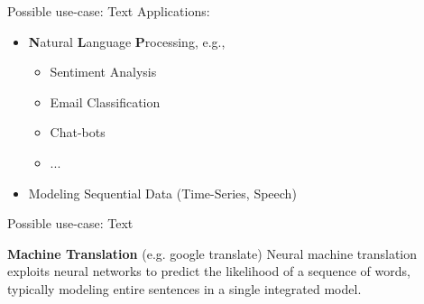 \begin{frame} {Possible use-case: Text}
Applications:
\vspace{.7cm}
\begin{itemize}
\item \textbf{N}atural \textbf{L}anguage \textbf{P}rocessing, e.g.,
\begin{itemize}
\item Sentiment Analysis
\vspace{.3cm}
\item Email Classification
\vspace{.3cm}
\item Chat-bots
\vspace{.3cm}
\item $...$
\end{itemize}
\vspace{.7cm}
\item Modeling Sequential Data (Time-Series, Speech)
\end{itemize}
\end{frame}

\begin{frame} {Possible use-case: Text}
\begin{figure}
\centering
{}
\end{figure}
\textbf{Machine Translation} (e.g. google translate) 
Neural machine translation exploits neural networks to predict the likelihood of a sequence of words, typically modeling entire sentences in a single integrated model.
\end{frame}

